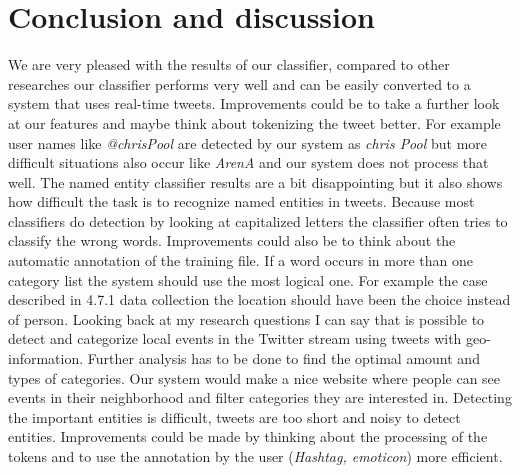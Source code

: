 \documentclass[
10pt, %
a4paper, %
oneside, %
headinclude,footinclude, %
BCOR5mm, %
]{scrartcl}
\begin{document}
\section{Conclusion and discussion}
We are very pleased with the results of our classifier, compared to other researches our classifier performs very well and can be easily converted to a system that uses real-time tweets. Improvements could be to take a further look at our features and maybe think about tokenizing the tweet better. For example user names like \textit{@chrisPool} are detected by our system as \textit{chris Pool} but more difficult situations also occur like \textit{ArenA} and our system does not process that well. 
\vl
The named entity classifier results are a bit disappointing but it also shows how difficult the task is to recognize named entities in tweets. Because most classifiers do detection by looking at capitalized letters the classifier often tries to classify the wrong words. Improvements could also be to think about the automatic annotation of the training file. If a word occurs in more than one category list the system should use the most logical one. For example the case described in 4.7.1 data collection the location should have been the choice instead of person.
\vl
Looking back at my research questions I can say that is possible to detect and categorize local events in the Twitter stream using tweets with geo-information. Further analysis has to be done to find the optimal amount and types of  categories. Our system would make a nice website where people can see events in their neighborhood and filter categories they are interested in. Detecting the important entities is difficult, tweets are too short and noisy to detect entities. Improvements could be made by thinking about the processing of the tokens and to use the annotation by the user (\textit{Hashtag, emoticon})  more efficient. 
\end{document}
